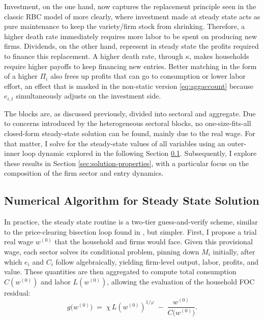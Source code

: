 \documentclass[a4paper,12pt]{article} %
\numberwithin{equation}{section} %
\numberwithin{figure}{section}
\numberwithin{table}{section}
\begin{document}
Investment, on the one hand, now captures the replacement principle seen in the classic RBC model 
of \textcite{campbell1994inspecting} more clearly, where investment made at steady state acts as pure maintenance to keep the variety/firm stock from shrinking. Therefore,
a higher death rate immediately requires more labor to be spent on producing new firms. Dividends, on the other hand, represent in
steady state the profits required to finance this replacement. A higher death rate, through $\kappa$, makes households require 
higher payoffs to keep financing new entries. Better matching in the form of a higher $\Pi_i$ also frees up profits that can go to 
consumption or lower labor effort, an effect that is masked in the non-static version \eqref{eq:aggaccount} because $e_{i,t}$ 
simultaneously adjusts on the investment side.

The blocks are,
as discussed previously, divided into sectoral and aggregate. Due to concerns introduced by the heterogeneous sectoral blocks, no
one-size-fits-all closed-form steady-state solution can be found, mainly due to the real wage. For that matter, I solve for the
steady-state values of all variables using an outer-inner loop dynamic explored in the following Section \ref{sec:solution-num}.
Subsequently, I explore these results in Section \ref{sec:solution-properties}, with a particular focus on the
composition of the firm sector and entry dynamics.


\subsection{Numerical Algorithm for Steady State Solution}
\label{sec:solution-num}

In practice, the steady state routine is a two‐tier guess‐and‐verify scheme, similar to the 
price-clearing bisection loop found in 
\textcite{khan2008idiosyncratic}, but simpler. 
First, I propose a trial real wage \(w^{(0)}\) that the household and firms would face. 
Given this provisional wage, each sector solves its conditional problem, pinning down \(M_i\) initially, after which $e_i$
and \(C_i\) follow algebraically, yielding firm-level output, labor, profits, and value. 
These quantities are then aggregated to compute total consumption \(C(w^{(0)})\) and labor \(L(w^{(0)})\), allowing the
evaluation of the household FOC residual:
\begin{equation}
g\bigl(w^{(0)}\bigr) \;=\; \chi\,L(w^{(0)})^{1/\varphi} \;-\; \frac{w^{(0)}}{C\bigl(w^{(0)}\bigr)}. \label{bisection}
\end{equation}
\end{document}
